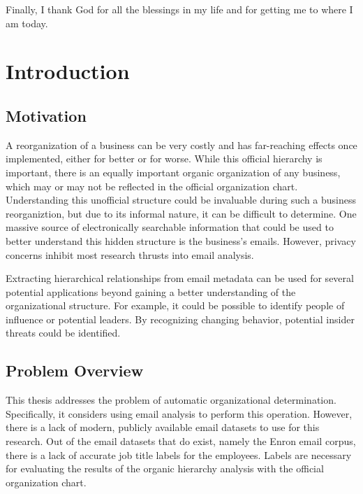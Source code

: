 \documentclass[12pt]{report}
\begin{document}
Finally, I thank God for all the blessings in my life and for getting me to where I am today.
\tableofcontents
\pagebreak

\listoffigures
\pagebreak

\listoftables
\pagebreak

\pagestyle{myheadings}

\chapter{Introduction} \label{Introduction}
\section{Motivation}
A reorganization of a business can be very costly and has far-reaching effects once implemented, either for better or for worse.
While this official hierarchy is important, there is an equally important organic organization of any business, which may or may not be reflected in the official organization chart.
Understanding this unofficial structure could be invaluable during such a business reorganiztion, but due to its informal nature, it can be difficult to determine.
One massive source of electronically searchable information that could be used to better understand this hidden structure is the business's emails.
However, privacy concerns inhibit most research thrusts into email analysis.  

Extracting hierarchical relationships from email metadata can be used for several potential applications beyond gaining a better understanding of the organizational structure.  For example, it could be possible to identify people of influence or potential leaders.  By recognizing changing behavior, potential insider threats could be identified.

\section{Problem Overview}
This thesis addresses the problem of automatic organizational determination.
Specifically, it considers using email analysis to perform this operation.
However, there is a lack of modern, publicly available email datasets to use for this research.
Out of the email datasets that do exist, namely the Enron email corpus, there is a lack of accurate job title labels for the employees.
Labels are necessary for evaluating the results of the organic hierarchy analysis with the official organization chart.
\end{document}
